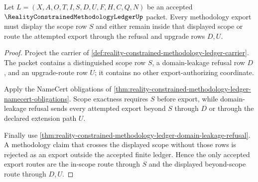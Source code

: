 \begin{theorem}
\label{thm:reality-constrained-methodology-ledger-scope-export-exactness}
Let $L=(X,A,O,T,I,S,D,U,F,H,C,Q,N)$ be an accepted $\RealityConstrainedMethodologyLedgerUp$ packet. Every methodology export must display the scope row $S$ and either remain inside that displayed scope or route the attempted export through the refusal and upgrade rows $D,U$.
\end{theorem}
\begin{proof}
Project the carrier of \autoref{def:reality-constrained-methodology-ledger-carrier}. The packet contains a distinguished scope row $S$, a domain-leakage refusal row $D$, and an upgrade-route row $U$; it contains no other export-authorizing coordinate.

Apply the NameCert obligations of \autoref{thm:reality-constrained-methodology-ledger-namecert-obligations}. Scope exactness requires $S$ before export, while domain-leakage refusal sends every attempted export beyond $S$ through $D$ or through the declared extension path $U$.

Finally use \autoref{thm:reality-constrained-methodology-ledger-domain-leakage-refusal}. A methodology claim that crosses the displayed scope without those rows is rejected as an export outside the accepted finite ledger. Hence the only accepted export routes are the in-scope route through $S$ and the displayed beyond-scope route through $D,U$.
\end{proof}

